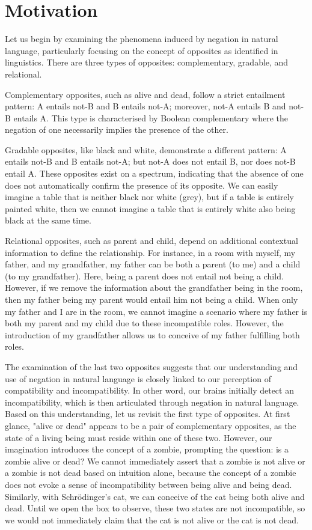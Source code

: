 \section{Motivation}

Let us begin by examining the phenomena induced by negation in natural language, particularly focusing on the concept of opposites as identified in linguistics. There are three types of opposites: complementary, gradable, and relational. 

Complementary opposites, such as alive and dead, follow a strict entailment pattern: A entails not-B and B entails not-A; moreover, not-A entails B and not-B entails A. This type is characterised by Boolean complementary where the negation of one necessarily implies the presence of the other. 

Gradable opposites, like black and white, demonstrate a different pattern: A entails not-B and B entails not-A; but not-A does not entail B, nor does not-B entail A. These opposites exist on a spectrum, indicating that the absence of one does not automatically confirm the presence of its opposite. We can easily imagine a table that is neither black nor white (grey), but if a table is entirely painted white, then we cannot imagine a table that is entirely white also being black at the same time. 

Relational opposites, such as parent and child, depend on additional contextual information to define the relationship. For instance, in a room with myself, my father, and my grandfather, my father can be both a parent (to me) and a child (to my grandfather). Here, being a parent does not entail not being a child. However, if we remove the information about the grandfather being in the room, then my father being my parent would entail him not being a child. When only my father and I are in the room, we cannot imagine a scenario where my father is both my parent and my child due to these incompatible roles. However, the introduction of my grandfather allows us to conceive of my father fulfilling both roles. 

The examination of the last two opposites suggests that our understanding and use of negation in natural language is closely linked to our perception of compatibility and incompatibility. In other word, our brains initially detect an incompatibility, which is then articulated through negation in natural language. Based on this understanding, let us revisit the first type of opposites. At first glance, "alive or dead" appears to be a pair of complementary opposites, as the state of a living being must reside within one of these two. However, our imagination introduces the concept of a zombie, prompting the question: is a zombie alive or dead? We cannot immediately assert that a zombie is not alive or a zombie is not dead based on intuition alone, because the concept of a zombie does not evoke a sense of incompatibility between being alive and being dead. Similarly, with Schrödinger's cat, we can conceive of the cat being both alive and dead. Until we open the box to observe, these two states are not incompatible, so we would not immediately claim that the cat is not alive or the cat is not dead. 


